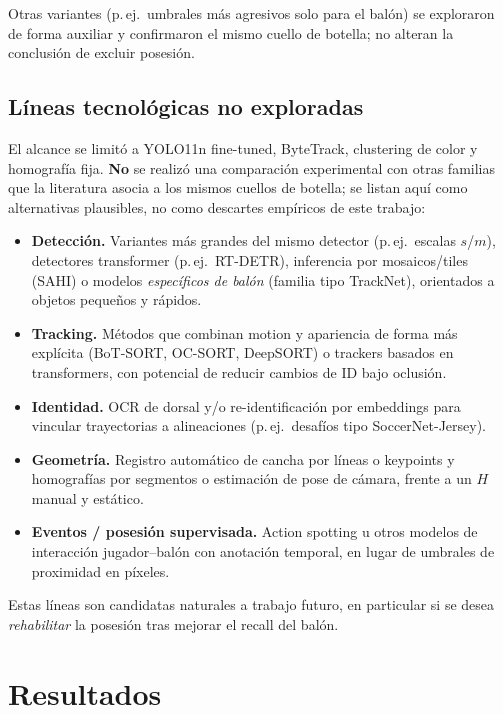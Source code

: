 \documentclass[conference]{IEEEtran}
\begin{document}
Otras variantes (p.\,ej.\ umbrales más agresivos solo para el balón) se exploraron de forma auxiliar y confirmaron el mismo cuello de botella; no alteran la conclusión de excluir posesión.

\subsection{Líneas tecnológicas no exploradas}
El alcance se limitó a YOLO11n fine-tuned, ByteTrack, clustering de color y homografía fija. \textbf{No} se realizó una comparación experimental con otras familias que la literatura asocia a los mismos cuellos de botella; se listan aquí como alternativas plausibles, no como descartes empíricos de este trabajo:

\begin{itemize}[leftmargin=*,itemsep=2pt]
  \item \textbf{Detección.} Variantes más grandes del mismo detector (p.\,ej.\ escalas $s$/$m$), detectores transformer (p.\,ej.\ RT-DETR), inferencia por mosaicos/tiles (SAHI) o modelos \emph{específicos de balón} (familia tipo TrackNet), orientados a objetos pequeños y rápidos.
  \item \textbf{Tracking.} Métodos que combinan motion y apariencia de forma más explícita (BoT-SORT, OC-SORT, DeepSORT) o trackers basados en transformers, con potencial de reducir cambios de ID bajo oclusión.
  \item \textbf{Identidad.} OCR de dorsal y/o re-identificación por embeddings para vincular trayectorias a alineaciones (p.\,ej.\ desafíos tipo SoccerNet-Jersey).
  \item \textbf{Geometría.} Registro automático de cancha por líneas o keypoints y homografías por segmentos o estimación de pose de cámara, frente a un $H$ manual y estático.
  \item \textbf{Eventos / posesión supervisada.} Action spotting u otros modelos de interacción jugador--balón con anotación temporal, en lugar de umbrales de proximidad en píxeles.
\end{itemize}

Estas líneas son candidatas naturales a trabajo futuro, en particular si se desea \emph{rehabilitar} la posesión tras mejorar el recall del balón.

\section{Resultados}
\label{sec:resultados}
\end{document}
